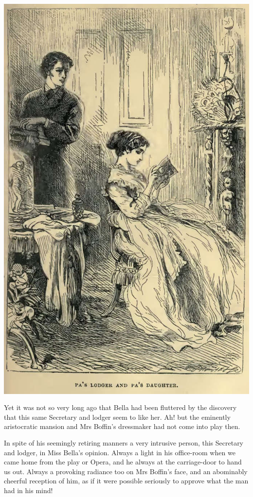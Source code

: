 \includegraphics[scale=2.3]{02-08-01}

Yet it was not so very long ago that Bella had been fluttered by the
discovery that this same Secretary and lodger seem to like her. Ah! but
the eminently aristocratic mansion and Mrs Boffin’s dressmaker had not
come into play then.

In spite of his seemingly retiring manners a very intrusive person, this
Secretary and lodger, in Miss Bella’s opinion. Always a light in his
office-room when we came home from the play or Opera, and he always at
the carriage-door to hand us out. Always a provoking radiance too on
Mrs Boffin’s face, and an abominably cheerful reception of him, as if it
were possible seriously to approve what the man had in his mind!

